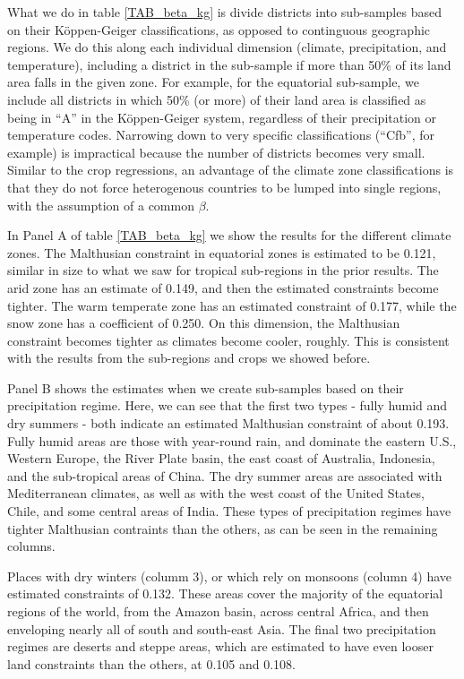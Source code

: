 \documentclass[11pt]{article}
\begin{document}
What we do in table \ref{TAB_beta_kg} is divide districts into sub-samples based on their K{\"o}ppen-Geiger classifications, as opposed to continguous geographic regions. We do this along each individual dimension (climate, precipitation, and temperature), including a district in the sub-sample if more than 50\% of its land area falls in the given zone. For example, for the equatorial sub-sample, we include all districts in which 50\% (or more) of their land area is classified as being in ``A'' in the K{\"o}ppen-Geiger system, regardless of their precipitation or temperature codes. Narrowing down to very specific classifications (``Cfb'', for example) is impractical because the number of districts becomes very small. Similar to the crop regressions, an advantage of the climate zone classifications is that they do not force heterogenous countries to be lumped into single regions, with the assumption of a common $\beta$. 

In Panel A of table \ref{TAB_beta_kg} we show the results for the different climate zones. The Malthusian constraint in equatorial zones is estimated to be 0.121, similar in size to what we saw for tropical sub-regions in the prior results. The arid zone has an estimate of 0.149, and then the estimated constraints become tighter. The warm temperate zone has an estimated constraint of 0.177, while the snow zone has a coefficient of 0.250. On this dimension, the Malthusian constraint becomes tighter as climates become cooler, roughly. This is consistent with the results from the sub-regions and crops we showed before. 

Panel B shows the estimates when we create sub-samples based on their precipitation regime. Here, we can see that the first two types - fully humid and dry summers - both indicate an estimated  Malthusian constraint of about 0.193. Fully humid areas are those with year-round rain, and dominate the eastern U.S., Western Europe, the River Plate basin, the east coast of Australia, Indonesia, and the sub-tropical areas of China. The dry summer areas are associated with Mediterranean climates, as well as with the west coast of the United States, Chile, and some central areas of India. These types of precipitation regimes have tighter Malthusian contraints than the others, as can be seen in the remaining columns.

Places with dry winters (columm 3), or which rely on monsoons (column 4) have estimated constraints of 0.132. These areas cover the majority of the equatorial regions of the world, from the Amazon basin, across central Africa, and then enveloping nearly all of south and south-east Asia. The final two precipitation regimes are deserts and steppe areas, which are estimated to have even looser land constraints than the others, at 0.105 and 0.108. 
\end{document}

